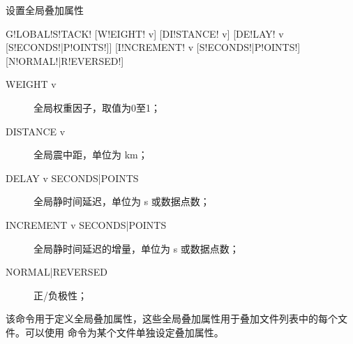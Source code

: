 \label{sss:globalstack}

设置全局叠加属性

\begin{SACSTX}
G!LOBAL!S!TACK! [W!EIGHT! v] [DI!STANCE! v] [DE!LAY! v [S!ECONDS!|P!OINTS!]]
    [I!NCREMENT! v [S!ECONDS!|P!OINTS!] [N!ORMAL!|R!EVERSED!]
\end{SACSTX}

\begin{description}
\item [WEIGHT v] 全局权重因子，取值为0至1；
\item [DISTANCE v] 全局震中距，单位为 \si{km}；
\item [DELAY v SECONDS|POINTS] 全局静时间延迟，单位为 \si{\s} 或数据点数；
\item [INCREMENT v SECONDS|POINTS] 全局静时间延迟的增量，单位为 \si{\s} 或数据点数；
\item [NORMAL|REVERSED] 正/负极性；
\end{description}

该命令用于定义全局叠加属性，这些全局叠加属性用于叠加文件列表中的每个文件。可以使用
命令为某个文件单独设定叠加属性。
